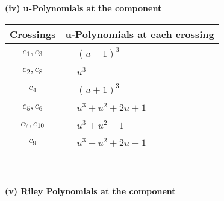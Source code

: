 \documentclass[1p]{elsarticle_modified}
\theoremstyle{definition}
\begin{document}
\newpage\renewcommand{\arraystretch}{1}
\flushleft \textbf{(iv) u-Polynomials at the component}\newline \\
\begin{tabular}{m{50pt}|m{274pt}}
Crossings & \hspace{64pt}u-Polynomials at each crossing \\
\hline $$\begin{aligned}c_{1},c_{3}\end{aligned}$$&$\begin{aligned}
&(u-1)^3
\end{aligned}$\\
\hline $$\begin{aligned}c_{2},c_{8}\end{aligned}$$&$\begin{aligned}
&u^3
\end{aligned}$\\
\hline $$\begin{aligned}c_{4}\end{aligned}$$&$\begin{aligned}
&(u+1)^3
\end{aligned}$\\
\hline $$\begin{aligned}c_{5},c_{6}\end{aligned}$$&$\begin{aligned}
&u^3+u^2+2 u+1
\end{aligned}$\\
\hline $$\begin{aligned}c_{7},c_{10}\end{aligned}$$&$\begin{aligned}
&u^3+u^2-1
\end{aligned}$\\
\hline $$\begin{aligned}c_{9}\end{aligned}$$&$\begin{aligned}
&u^3- u^2+2 u-1
\end{aligned}$\\
\hline
\end{tabular}\\~\\
\newpage\renewcommand{\arraystretch}{1}
\flushleft \textbf{(v) Riley Polynomials at the component}\newline \\
\end{document}
